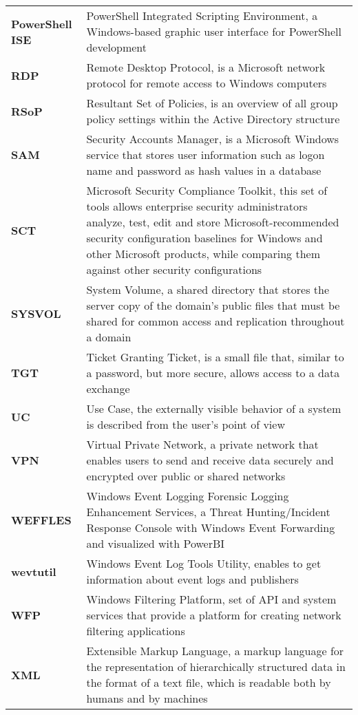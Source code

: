 \begin{longtable}{ p{4cm}  p{12cm} }
    \textbf{PowerShell ISE} & PowerShell Integrated Scripting Environment, a Windows-based graphic user interface for PowerShell development\\
    \textbf{RDP} & Remote Desktop Protocol, is a Microsoft network protocol for remote access to Windows computers\\
    \textbf{RSoP} & Resultant Set of Policies, is an overview of all group policy settings within the Active Directory structure\\
    \textbf{SAM} & Security Accounts Manager, is a Microsoft Windows service that stores user information such as logon name and password as hash values in a database\\
    \textbf{SCT} & Microsoft Security Compliance Toolkit, this set of tools allows enterprise security administrators analyze, test, edit and store Microsoft-recommended security configuration baselines for Windows and other Microsoft products, while comparing them against other security configurations\\
    \textbf{SYSVOL} & System Volume, a shared directory that stores the server copy of the domain's public files that must be shared for common access and replication throughout a domain\\
    \textbf{TGT} & Ticket Granting Ticket, is a small file that, similar to a password, but more secure, allows access to a data exchange\\
    \textbf{UC} & Use Case, the externally visible behavior of a system is described from the user's point of view\\
    \textbf{VPN} & Virtual Private Network, a private network that enables users to send and receive data securely and encrypted over public or shared networks\\
    \textbf{WEFFLES} & Windows Event Logging Forensic Logging Enhancement Services, a Threat Hunting/Incident Response Console with Windows Event Forwarding and visualized with PowerBI\\
    \textbf{wevtutil} & Windows Event Log Tools Utility, enables to get information about event logs and publishers\\
    \textbf{WFP} & Windows Filtering Platform,  set of API and system services that provide a platform for creating network filtering applications\\
    \textbf{XML} & Extensible Markup Language,  a markup language for the representation of hierarchically structured data in the format of a text file, which is readable both by humans and by machines\\
\end{longtable}
